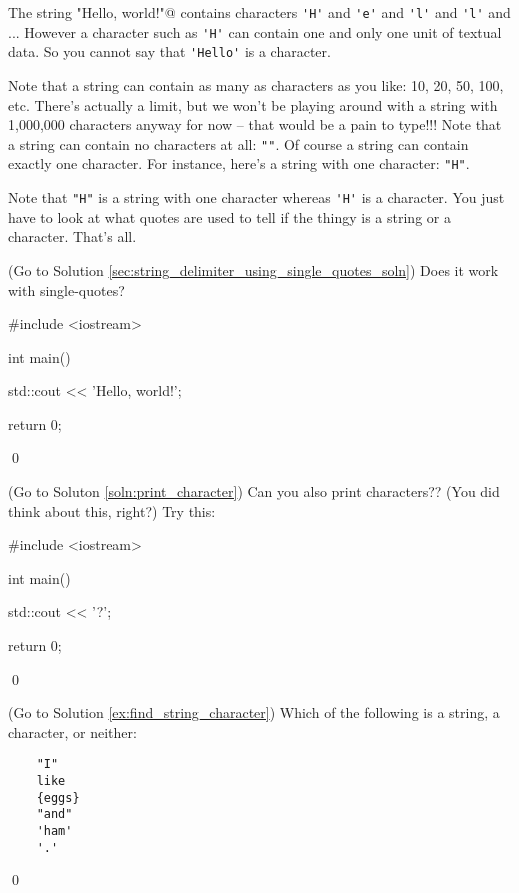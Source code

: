 The string \verb@"Hello, world!\n"@ contains characters 
\verb!'H'! and \verb!'e'! and \verb!'l'! and \verb!'l'! and 
... 
However a character such as 
\verb!'H'! can contain one and only one unit of textual data. 
So you cannot say that \verb!'Hello'! is a character. 

Note that a string can contain as many as characters as you like: 
10, 20, 50, 100, etc. 
There's actually a limit, but we won't be playing around with a string with 
1,000,000 characters anyway for now --
that would be a pain to type!!! 
Note that a string can contain no characters at all: 
\verb!""!. 
Of course a string can contain exactly one character. 
For instance, here's a string with one character: \verb!"H"!. 

Note that \verb!"H"! is a string with one character whereas 
\verb!'H'! is a character. 
You just have to look at what quotes are used to tell if the thingy is a 
string or a character. That's all.


\begin{ex} \label{sec:string_delimiter_using_single_quotes} 
(Go to Solution \ref{sec:string_delimiter_using_single_quotes_soln})
Does it work with single-quotes?
\begin{console}
#include <iostream>

int main()
{
    std::cout << 'Hello, world!\n';

    return 0;
}
\end{console}
\qed
\end{ex}


\begin{ex} \label{ex:print_character}
(Go to Soluton \ref{soln:print_character})
Can you also print characters?? (You did think about this, right?) Try this:
\begin{console}
#include <iostream>

int main()
{
    std::cout << '?';

    return 0;
}
\end{console}
\qed
\end{ex}


\begin{ex} \label{soln:find_string_character}
(Go to Solution \ref{ex:find_string_character})
Which of the following is a string, a character, or neither:
\begin{verbatim}
    "I"      
    like     
    {eggs}   
    "and"    
    'ham'    
    '.'      
\end{verbatim}
\qed
\end{ex}


